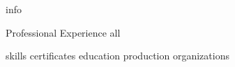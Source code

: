 \documentclass[10pt]{article}
\begin{document}
{info}

\begin{section}{Professional Experience}
  {all}
\end{section}

{skills}
{certificates}
{education}
{production}
{organizations}
\end{document}
